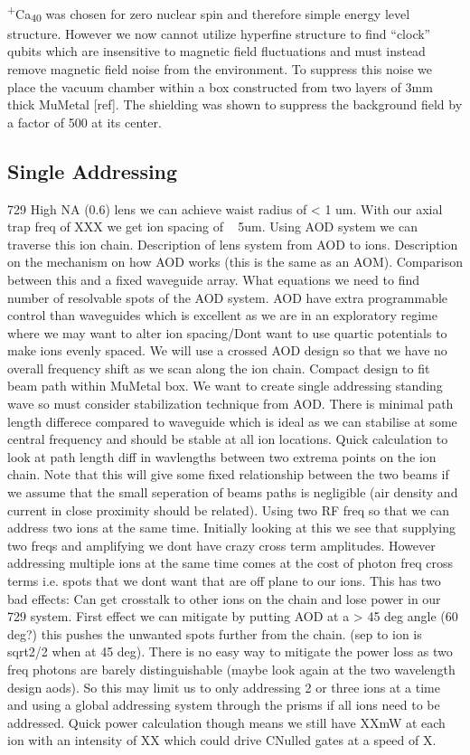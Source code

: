 \documentclass[12pt]{iopart}
\begin{document}
\textsuperscript{+}Ca\textsubscript{40} was chosen for zero nuclear
spin and therefore simple energy level structure. However we now
cannot utilize hyperfine structure to find ``clock'' qubits which are
insensitive to magnetic field fluctuations and must instead remove
magnetic field noise from the environment. To suppress this noise 
we place the vacuum chamber within a box constructed from two layers
of 3mm thick MuMetal [ref]. The shielding was shown to suppress the
background field by a factor of 500 at its center.

\subsection{Single Addressing}

729 High NA (0.6) lens we can achieve waist radius of < 1 um.  With
our axial trap freq of XXX we get ion spacing of ~ 5um.  Using AOD
system we can traverse this ion chain.  Description of lens system
from AOD to ions.
Description on the mechanism on how AOD works (this is the same as an
AOM). Comparison between this and a fixed waveguide array. What
equations we need to find number of resolvable spots of the AOD
system. AOD have extra programmable control than waveguides which is
excellent as we are in an exploratory regime where we may want to
alter ion spacing/Dont want to use quartic potentials to make ions
evenly spaced.
We will use a crossed AOD design so that we have no overall frequency
shift as we scan along the ion chain.
Compact design to fit beam path within MuMetal box.
We want to create single addressing standing wave so must consider
stabilization technique from AOD. 
There is minimal path length differece compared to waveguide which is
ideal as we can stabilise at some central frequency and should be
stable at all ion locations.
Quick calculation to look at path length diff in wavlengths between
two extrema points on the ion chain. Note that this will give some
fixed relationship between the two beams if we assume that the small
seperation of beams paths is negligible (air density and current in
close proximity should be related).
Using two RF freq so that we can address two ions at the same
time. Initially looking at this we see that supplying two freqs and
amplifying we dont have crazy cross term amplitudes.
However addressing multiple ions at the same time comes at the cost of
photon freq cross terms i.e. spots that we dont want that are off
plane to our ions. This has two bad effects: Can get crosstalk to
other ions on the chain and lose power in our 729 system. First effect
we can mitigate by putting AOD at a > 45 deg angle (60 deg?) this
pushes the unwanted spots further from the chain. (sep to ion is
sqrt2/2 when at 45 deg). There is no easy way to mitigate the power
loss as two freq photons are barely distinguishable (maybe look again
at the two wavelength design aods). So this may limit us to only
addressing 2 or three ions at a time and using a global addressing
system through the prisms if all ions need to be addressed. Quick
power calculation though means we still have XXmW at each ion with an
intensity of XX which could drive CNulled gates at a speed of X.
\end{document}

